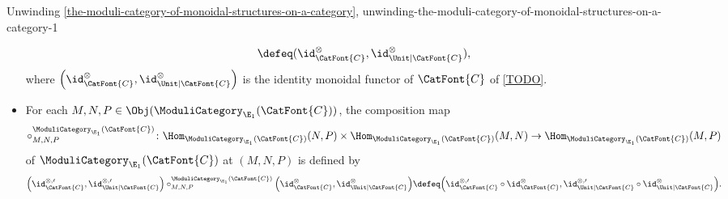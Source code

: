 \begin{remark}{Unwinding \cref{the-moduli-category-of-monoidal-structures-on-a-category}, \rmI}{unwinding-the-moduli-category-of-monoidal-structures-on-a-category-1}
\begin{itemize}
\[                \defeq
                (\id^{\otimes}_{\CatFont{C}},\id^{\otimes}_{\Unit|\CatFont{C}}),%
            \]%
            where $\Big(\id^{\otimes}_{\CatFont{C}},\id^{\otimes}_{\Unit|\CatFont{C}}\Big)$ is the identity monoidal functor of $\CatFont{C}$ of \cref{TODO}.
        \item{}For each $M,N,P\in\Obj(\ModuliCategory_{\E_{1}}(\CatFont{C}))$, the composition map
            \[
                \circ^{\ModuliCategory_{\E_{1}}(\CatFont{C})}_{M,N,P}%
                \colon%
                \Hom_{\ModuliCategory_{\E_{1}}(\CatFont{C})}(N,P)%
                \times%
                \Hom_{\ModuliCategory_{\E_{1}}(\CatFont{C})}(M,N)%
                \to%
                \Hom_{\ModuliCategory_{\E_{1}}(\CatFont{C})}(M,P)%
            \]%
            of $\ModuliCategory_{\E_{1}}(\CatFont{C})$ at $(M,N,P)$ is defined by
            \[
                \Big(\id^{\otimes,\prime}_{\CatFont{C}},\id^{\otimes,\prime}_{\Unit|\CatFont{C}}\Big)%
                \mathbin{\circ^{\ModuliCategory_{\E_{1}}(\CatFont{C})}_{M,N,P}}%
                \Big(\id^{\otimes}_{\CatFont{C}},\id^{\otimes}_{\Unit|\CatFont{C}}\Big)%
                \defeq
                \Big(\id^{\otimes,\prime}_{\CatFont{C}}\circ\id^{\otimes}_{\CatFont{C}},\id^{\otimes,\prime}_{\Unit|\CatFont{C}}\circ\id^{\otimes}_{\Unit|\CatFont{C}}\Big).%
            \]%
    \end{itemize}
\end{remark}
